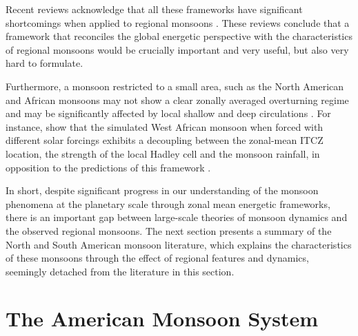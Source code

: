 Recent reviews acknowledge that all these frameworks have significant shortcomings when applied to regional monsoons \citep{biasutti2018global,hill2019,geen2020}. These reviews conclude that a framework that reconciles the global energetic perspective with the characteristics of regional monsoons would be crucially important and very useful, but also very hard to formulate. 

Furthermore, a monsoon restricted to a small area, such as the North American and African monsoons may not show a clear zonally averaged overturning regime and may be significantly affected by local shallow and deep circulations \citep{zhai2015regime}. For instance, \cite{smyth2018simulated} show that the simulated West African monsoon when forced with different solar forcings exhibits a decoupling between the zonal-mean ITCZ location, the strength of the local Hadley cell and the monsoon rainfall, in opposition to the predictions of this framework \citep{bordoni2008monsoons}.


In short, despite significant progress in our understanding of the monsoon phenomena at the planetary scale through zonal mean energetic frameworks, there is an important gap between large-scale theories of monsoon dynamics and the observed regional monsoons. 
The next section presents a summary of the North and South American monsoon literature, which explains the characteristics of these monsoons through the effect of regional features and dynamics, seemingly detached from the literature in this section.

\section{The American Monsoon System}\label{sq:bk_ams}

